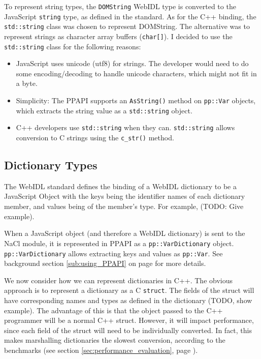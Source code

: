 To represent string types, the \lstinline{DOMString} WebIDL type is converted to the JavaScript \lstinline{string} type, as defined in the standard. As for the C++ binding, the \lstinline{std::string} class was chosen to represent DOMString. The alternative was to represent strings as character array buffers (\lstinline{char[]}). I decided to use the \lstinline{std::string} class for the following reasons:

\begin{itemize}
	\item JavaScript uses unicode (utf8) for strings. The developer would need to do some encoding/decoding to handle unicode characters, which might not fit in a byte.
	\item Simplicity: The PPAPI supports an \lstinline{AsString()} method on \lstinline{pp::Var} objects, which extracts the string value as a \lstinline{std::string} object.
	\item C++ developers use \lstinline{std::string} when they can. \lstinline{std::string} allows conversion to C strings using the \lstinline{c_str()} method.
\end{itemize}


\subsection{Dictionary Types} %
\label{sub:dictionary_types}
The WebIDL standard defines the binding of a WebIDL dictionary to be a JavaScript Object with the keys being the identifier names of each dictionary member, and values being of the member's type. For example, (TODO: Give example).

When a JavaScript object (and therefore a WebIDL dictionary) is sent to the NaCl module, it is represented in PPAPI as a \lstinline{pp::VarDictionary} object. \lstinline{pp::VarDictionary} allows extracting keys and values as \lstinline{pp::Var}. See background section \ref{sub:using_PPAPI} on page \pageref{sub:using_PPAPI} for more details.

We now consider how we can represent dictionaries in C++. The obvious approach is to represent a dictionary as a C \lstinline{struct}. The fields of the struct will have corresponding names and types as defined in the dictionary (TODO, show example). The advantage of this is that the object passed to the C++ programmer will be a normal C++ struct. However, it will impact performance, since each field of the struct will need to be individually converted. In fact, this makes marshalling dictionaries the slowest conversion, according to the benchmarks (see section \ref{sec:performance_evaluation}, page \pageref{sec:performance_evaluation}).

